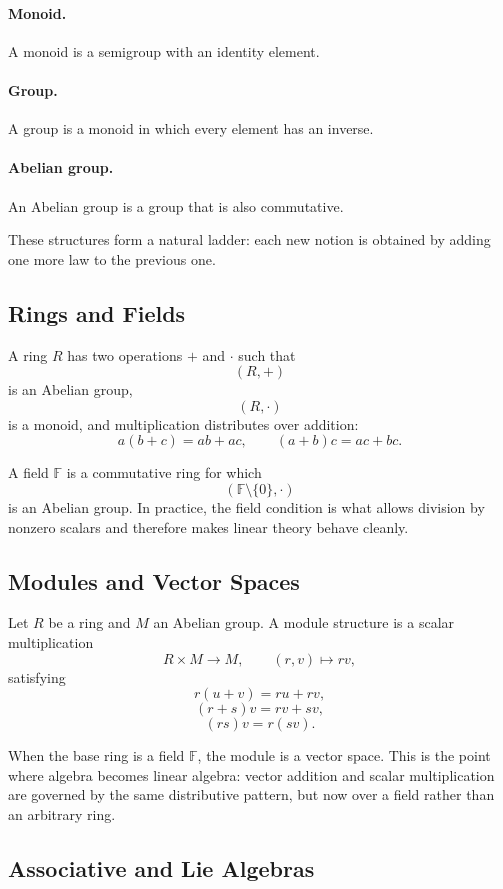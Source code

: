 \documentclass[11pt]{article}
\newcommand{\F}{\mathbb{F}}
\begin{document}
\paragraph{Monoid.}
A monoid is a semigroup with an identity element.

\paragraph{Group.}
A group is a monoid in which every element has an inverse.

\paragraph{Abelian group.}
An Abelian group is a group that is also commutative.

These structures form a natural ladder: each new notion is obtained by adding
one more law to the previous one.

\subsection{Rings and Fields}

A ring \(R\) has two operations \(+\) and \(\cdot\) such that
\[
  (R,+)
\]
is an Abelian group,
\[
  (R,\cdot)
\]
is a monoid, and multiplication distributes over addition:
\[
  a(b+c) = ab + ac,
  \qquad
  (a+b)c = ac + bc.
\]

A field \(\F\) is a commutative ring for which
\[
  (\F \setminus \{0\}, \cdot)
\]
is an Abelian group. In practice, the field condition is what allows division by
nonzero scalars and therefore makes linear theory behave cleanly.

\subsection{Modules and Vector Spaces}

Let \(R\) be a ring and \(M\) an Abelian group. A module structure is a scalar
multiplication
\[
  R \times M \to M,
  \qquad
  (r,v) \mapsto rv,
\]
satisfying
\[
  r(u+v) = ru + rv,
\]
\[
  (r+s)v = rv + sv,
\]
\[
  (rs)v = r(sv).
\]

When the base ring is a field \(\F\), the module is a vector space. This is the
point where algebra becomes linear algebra: vector addition and scalar
multiplication are governed by the same distributive pattern, but now over a
field rather than an arbitrary ring.

\subsection{Associative and Lie Algebras}
\end{document}
